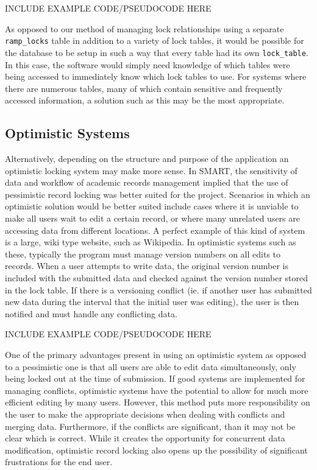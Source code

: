 \documentclass[12pt]{article}
\newcommand{\code}[1]{\texttt{#1}}
\begin{document}
INCLUDE EXAMPLE CODE/PSEUDOCODE HERE

As opposed to our method of managing lock relationships using a separate \code{ramp\_locks} table in addition to a variety of lock tables, it would be possible for the database to be setup in such a way that every table had its own \code{lock\_table}. In this case, the software would simply need knowledge of which tables were being accessed to immediately know which lock tables to use. For systems where there are numerous tables, many of which contain sensitive and frequently accessed information, a solution such as this may be the most appropriate.

\subsection{Optimistic Systems}
Alternatively, depending on the structure and purpose of the application an optimistic locking system may make more sense. In SMART, the sensitivity of data and workflow of academic records management implied that the use of pessimistic record locking was better suited for the project. Scenarios in which an optimistic solution would be better suited include cases where it is unviable to make all users wait to edit a certain record, or where many unrelated users are accessing data from different locations. A perfect example of this kind of system is a large, wiki type website, such as Wikipedia. In optimistic systems such as these, typically the program must manage version numbers on all edits to records. When a user attempts to write data, the original version number is included with the submitted data and checked against the version number stored in the lock table. If there is a versioning conflict (ie. if another user has submitted new data during the interval that the initial user was editing), the user is then notified and must handle any conflicting data. 

INCLUDE EXAMPLE CODE/PSEUDOCODE HERE

One of the primary advantages present in using an optimistic system as opposed to a pessimistic one is that all users are able to edit data simultaneously, only being locked out at the time of submission. If good systems are implemented for managing conflicts, optimistic systems have the potential to allow for much more efficient editing by many users. However, this method puts more responsibility on the user to make the appropriate decisions when dealing with conflicts and merging data. Furthermore, if the conflicts are significant, than it may not be clear which is correct. While it creates the opportunity for concurrent data modification, optimistic record locking also opens up the possibility of significant frustrations for the end user.
\end{document}
